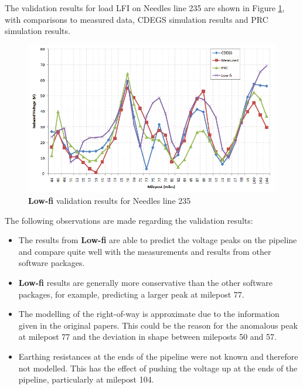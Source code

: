 \documentclass{article}
\begin{document}
The validation results for load LFI on Needles line 235 are shown in Figure \ref{fig:needles_comparison}, with comparisons to measured data, CDEGS simulation results and PRC simulation results.

\begin{figure}[!htp]
\begin{center}
\caption{\textbf{Low-fi} validation results for Needles line 235}
\label{fig:needles_comparison}
\includegraphics[width=\linewidth]{./Figures/needles_comparison.png}
\end{center}
\end{figure}

The following observations are made regarding the validation results:
\begin{itemize}
\item The results from \textbf{Low-fi} are able to predict the voltage peaks on the pipeline and compare quite well with the measurements and results from other software packages.
\item \textbf{Low-fi} results are generally more conservative than the other software packages, for example, predicting a larger peak at milepost 77. 
\item The modelling of the right-of-way is approximate due to the information given in the original papers. This could be the reason for the anomalous peak at milepost 77 and the deviation in shape between mileposts 50 and 57.
\item Earthing resistances at the ends of the pipeline were not known and therefore not modelled. This has the effect of pushing the voltage up at the ends of the pipeline, particularly at milepost 104.
\end{itemize}

\newpage


\end{document}
